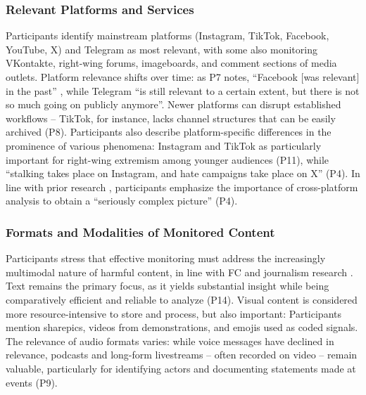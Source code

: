\documentclass[acmsmall]{acmart}
\begin{document}
\subsubsection{Relevant Platforms and Services}
Participants identify mainstream platforms (Instagram, TikTok, Facebook, YouTube, X) and Telegram as most relevant, with some also monitoring VKontakte, right-wing forums, imageboards, and comment sections of media outlets. Platform relevance shifts over time: as P7 notes, ``Facebook [was relevant] in the past'' , while Telegram ``is still relevant to a certain extent, but there is not so much going on publicly anymore''. Newer platforms can disrupt established workflows -- TikTok, for instance, lacks channel structures that can be easily archived (P8).
Participants also describe platform-specific differences in the prominence of various phenomena: Instagram and TikTok as particularly important for right-wing extremism among younger audiences (P11), while ``stalking takes place on Instagram, and hate campaigns take place on X'' (P4). In line with prior research \cite{rogers_propagation_2023}, participants emphasize the importance of cross-platform analysis to obtain a ``seriously complex picture'' (P4).

\subsubsection{Formats and Modalities of Monitored Content}
Participants stress that effective monitoring must address the increasingly multimodal nature of harmful content, in line with FC and journalism research \cite{nordis_report_2022,cifliku_save_2025}. 
Text remains the primary focus, as it yields substantial insight while being comparatively efficient and reliable to analyze (P14). 
Visual content is considered more resource-intensive to store and process, but also important: Participants mention sharepics, videos from demonstrations, and emojis used as coded signals. 
The relevance of audio formats varies: while voice messages have declined in relevance, podcasts and long-form livestreams -- often recorded on video -- remain valuable, particularly for identifying actors and documenting statements made at events (P9).
\end{document}
